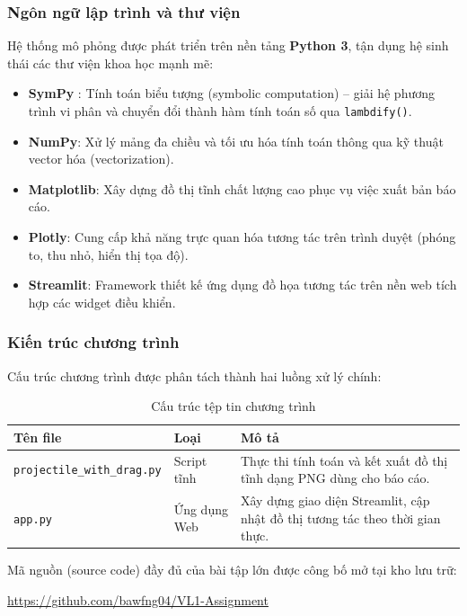 \subsubsection{Ngôn ngữ lập trình và thư viện}
Hệ thống mô phỏng được phát triển trên nền tảng \textbf{Python 3}, tận dụng hệ sinh thái các thư viện khoa học mạnh mẽ:

\begin{itemize}[nosep]
    \item \textbf{SymPy} \cite{sympy_docs}: Tính toán biểu tượng (symbolic computation) -- giải hệ phương trình vi phân và chuyển đổi thành hàm tính toán số qua \texttt{lambdify()}.
    \item \textbf{NumPy}: Xử lý mảng đa chiều và tối ưu hóa tính toán thông qua kỹ thuật vector hóa (vectorization).
    \item \textbf{Matplotlib}: Xây dựng đồ thị tĩnh chất lượng cao phục vụ việc xuất bản báo cáo.
    \item \textbf{Plotly}: Cung cấp khả năng trực quan hóa tương tác trên trình duyệt (phóng to, thu nhỏ, hiển thị tọa độ).
    \item \textbf{Streamlit}: Framework thiết kế ứng dụng đồ họa tương tác trên nền web tích hợp các widget điều khiển.
\end{itemize}

\subsubsection{Kiến trúc chương trình}
Cấu trúc chương trình được phân tách thành hai luồng xử lý chính:

\begin{table}[H]
\centering
\caption{Cấu trúc tệp tin chương trình}
\begin{tabular}{|l|l|p{7.5cm}|}
\hline
\textbf{Tên file} & \textbf{Loại} & \textbf{Mô tả} \\
\hline
\texttt{projectile\_with\_drag.py} & Script tĩnh & Thực thi tính toán và kết xuất đồ thị tĩnh dạng PNG dùng cho báo cáo. \\
\hline
\texttt{app.py} & Ứng dụng Web & Xây dựng giao diện Streamlit, cập nhật đồ thị tương tác theo thời gian thực. \\
\hline
\end{tabular}
\end{table}

Mã nguồn (source code) đầy đủ của bài tập lớn được công bố mở tại kho lưu trữ:

\begin{center}
\url{https://github.com/bawfng04/VL1-Assignment}
\end{center}


